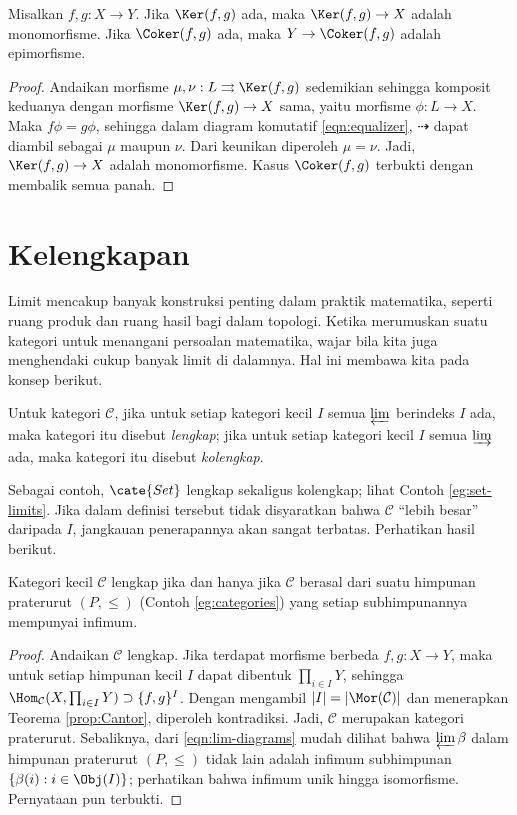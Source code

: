 \begin{lemma}
	Misalkan $f,g: X \to Y$. Jika $\Ker(f,g)$ ada, maka $\Ker(f,g) \to X$ adalah monomorfisme. Jika $\Coker(f,g)$ ada, maka $Y \to \Coker(f,g)$ adalah epimorfisme.
\end{lemma}
\begin{proof}
	Andaikan morfisme $\mu, \nu: L \rightrightarrows \Ker(f,g)$ sedemikian sehingga komposit keduanya dengan morfisme $\Ker(f,g) \to X$ sama, yaitu morfisme $\phi: L \to X$. Maka $f\phi = g\phi$, sehingga dalam diagram komutatif \eqref{eqn:equalizer}, $\dasharrow$ dapat diambil sebagai $\mu$ maupun $\nu$. Dari keunikan diperoleh $\mu=\nu$. Jadi, $\Ker(f,g) \to X$ adalah monomorfisme. Kasus $\Coker(f,g)$ terbukti dengan membalik semua panah.
\end{proof}
	
\section{Kelengkapan}
Limit mencakup banyak konstruksi penting dalam praktik matematika, seperti ruang produk dan ruang hasil bagi dalam topologi. Ketika merumuskan suatu kategori untuk menangani persoalan matematika, wajar bila kita juga menghendaki cukup banyak limit di dalamnya. Hal ini membawa kita pada konsep berikut.

\begin{definition}\label{def:completeness}
	Untuk kategori $\mathcal{C}$, jika untuk setiap kategori kecil $I$ semua $\varprojlim$ berindeks $I$ ada, maka kategori itu disebut \emph{lengkap}; jika untuk setiap kategori kecil $I$ semua $\varinjlim$ ada, maka kategori itu disebut \emph{kolengkap}.
\end{definition}
Sebagai contoh, $\cate{Set}$ lengkap sekaligus kolengkap; lihat Contoh \ref{eg:set-limits}. Jika dalam definisi tersebut tidak disyaratkan bahwa $\mathcal{C}$ ``lebih besar'' daripada $I$, jangkauan penerapannya akan sangat terbatas. Perhatikan hasil berikut.
\begin{proposition}[P.\ Freyd]\label{prop:preorder-complete}
	Kategori kecil $\mathcal{C}$ lengkap jika dan hanya jika $\mathcal{C}$ berasal dari suatu himpunan praterurut $(P, \leq)$ (Contoh \ref{eg:categories}) yang setiap subhimpunannya mempunyai infimum.
\end{proposition}
\begin{proof}
	Andaikan $\mathcal{C}$ lengkap. Jika terdapat morfisme berbeda $f, g: X \to Y$, maka untuk setiap himpunan kecil $I$ dapat dibentuk $\prod_{i \in I} Y$, sehingga $\Hom_{\mathcal{C}}(X, \prod_{i \in I} Y) \supset \{f, g\}^I$. Dengan mengambil $|I| = |\Mor(\mathcal{C})|$ dan menerapkan Teorema \ref{prop:Cantor}, diperoleh kontradiksi. Jadi, $\mathcal{C}$ merupakan kategori praterurut. Sebaliknya, dari \eqref{eqn:lim-diagrams} mudah dilihat bahwa $\varprojlim \beta$ dalam himpunan praterurut $(P, \leq)$ tidak lain adalah infimum subhimpunan $\{\beta(i) : i \in \Obj(I) \}$; perhatikan bahwa infimum unik hingga isomorfisme. Pernyataan pun terbukti.
\end{proof}

